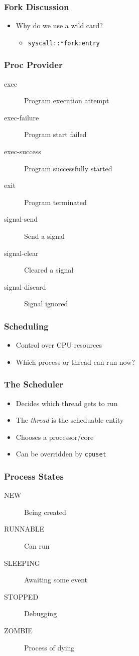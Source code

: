 \documentclass[pdftex]{beamer} %
\begin{document}
\begin{frame}[fragile]
  \frametitle{Fork Discussion}
  \begin{itemize}
  \item Why do we use a wild card?
    \begin{itemize}
    \item \verb+syscall::*fork:entry+
    \end{itemize}
  \end{itemize}
\end{frame}

\begin{frame}
  \frametitle{Proc Provider}
  \begin{description}
  \item[exec] Program execution attempt
  \item[exec-failure] Program start failed
  \item[exec-success] Program successfully started
  \item[exit] Program terminated
  \item[signal-send] Send a signal
  \item[signal-clear] Cleared a signal
  \item[signal-discard] Signal ignored
  \end{description}
\end{frame}

\begin{frame}
  \frametitle{Scheduling}
  \begin{itemize}
  \item Control over CPU resources
  \item Which process or thread can run now?
  \end{itemize}
\end{frame}

\begin{frame}[fragile]
  \frametitle{The Scheduler}
  \begin{itemize}
  \item Decides which thread gets to run
  \item The \emph{thread} is the scheduable entity
  \item Chooses a processor/core
  \item Can be overridden by \verb+cpuset+
  \end{itemize}
\end{frame}

\begin{frame}
  \frametitle{Process States}
  \begin{description}
  \item[NEW] Being created
  \item[RUNNABLE] Can run
  \item[SLEEPING] Awaiting some event
  \item[STOPPED] Debugging
  \item[ZOMBIE] Process of dying
  \end{description}
\end{frame}
\end{document}
